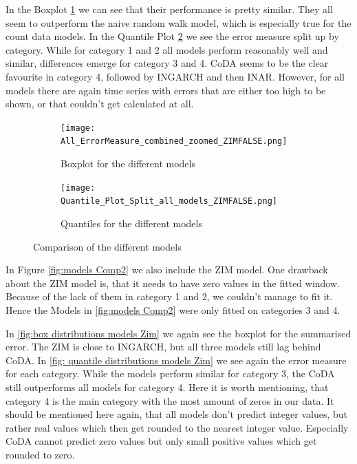 In the Boxplot \ref{fig:box distributions models} we can see that their performance is pretty similar. They all seem to outperform the naive random walk model, which is especially true for the count data models. 
In the Quantile Plot \ref{fig: quantile distributions models} we see the error measure split up by category. While for category 1 and 2 all models perform reasonably well and similar, differences emerge for category 3 and 4. CoDA seems to be the clear favourite in category 4, followed by INGARCH and then INAR. However, for all models there are again time series with errors that are either too high to be shown, or that couldn't get calculated at all. 
\begin{figure}[htb!]
\centering
\begin{subfigure}[b]{0.8\textwidth}
\texttt{[image: All\_ErrorMeasure\_combined\_zoomed\_ZIMFALSE.png]}
\caption{Boxplot for the different models}
\label{fig:box distributions models}
\end{subfigure}
\hfill
\begin{subfigure}[b]{0.8\textwidth}
\texttt{[image: Quantile\_Plot\_Split\_all\_models\_ZIMFALSE.png]}
\caption{Quantiles for the different models}
\label{fig: quantile distributions models}
\end{subfigure}
\hfill
\caption{Comparison of the different models}
\label{fig:models Comp1}
\end{figure}

In Figure \ref{fig:models Comp2} we also include the ZIM model. One drawback about the ZIM model is, that it needs to have zero values in the fitted window. Because of the lack of them in category 1 and 2, we couldn't manage to fit it. Hence the Models in \ref{fig:models Comp2} were only fitted on categories 3 and 4. 

In \ref{fig:box distributions models Zim} we again see the boxplot for the summarised error. The ZIM is close to INGARCH, but all three models still lag behind CoDA. In \ref{fig: quantile distributions models Zim} we see again the error measure for each category. While the models perform similar for category 3, the CoDA still outperforms all models for category 4. Here it is worth mentioning, that category 4 is the main category with the most amount of zeros in our data. It should be mentioned here again, that all models don't predict integer values, but rather real values which then get rounded to the nearest integer value. Especially CoDA cannot predict zero values but only small positive values which get rounded to zero.

